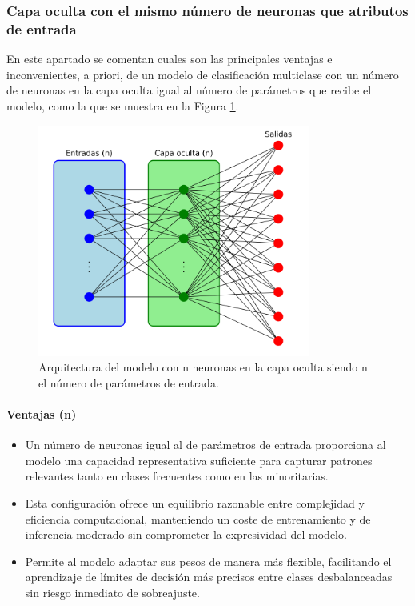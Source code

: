 \subsubsection{Capa oculta con el mismo número de neuronas que atributos de entrada}\label{sec:VIMUL49}
En este apartado se comentan cuales son las principales ventajas e inconvenientes, a priori, de un modelo de clasificación multiclase con un número de neuronas en la capa oculta igual al número de parámetros que recibe el modelo, como la que se muestra en la Figura \ref{fig:arqnMUL}.

\begin{figure}[H]
    \centering
    \includegraphics[width=0.8\textwidth]{./img/modelo/arqnMUL.pdf}
    \caption{Arquitectura del modelo con n neuronas en la capa oculta siendo n el número de parámetros de entrada.}
    \label{fig:arqnMUL}
\end{figure}

\paragraph{Ventajas (n)}
\begin{itemize}
	\item Un número de neuronas igual al de parámetros de entrada proporciona al modelo una capacidad representativa suficiente para capturar patrones relevantes tanto en clases frecuentes como en las minoritarias.
	\item Esta configuración ofrece un equilibrio razonable entre complejidad y eficiencia computacional, manteniendo un coste de entrenamiento y de inferencia moderado sin comprometer la expresividad del modelo.
	\item Permite al modelo adaptar sus pesos de manera más flexible, facilitando el aprendizaje de límites de decisión más precisos entre clases desbalanceadas sin riesgo inmediato de sobreajuste.

\end{itemize}
